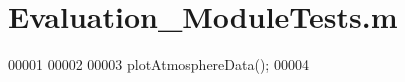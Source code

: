 \hypertarget{_evaluation___module_tests_8m_source}{}\section{Evaluation\+\_\+\+Module\+Tests.\+m}
\label{_evaluation___module_tests_8m_source}

\begin{DoxyCode}
00001 %
00002 
00003 plotAtmosphereData();
00004 
\end{DoxyCode}
